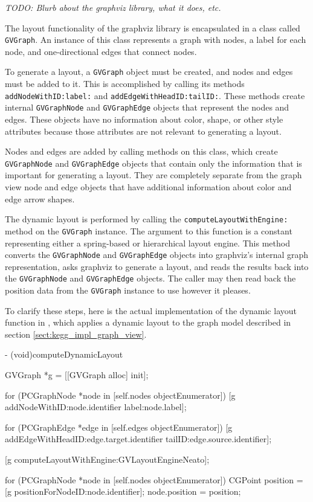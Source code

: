 \emph{TODO: Blurb about the graphviz library, what it does, etc.}

The layout functionality of the graphviz library is encapsulated in a class
called \texttt{GVGraph}. An instance of this class represents a graph with
nodes, a label for each node, and one-directional edges that connect nodes.

To generate a layout, a \texttt{GVGraph} object must be created, and nodes and
edges must be added to it. This is accomplished by calling its methods
\texttt{addNodeWithID:label:} and \texttt{addEdgeWithHeadID:tailID:}. These
methods create internal \texttt{GVGraphNode} and \texttt{GVGraphEdge} objects
that represent the nodes and edges. These objects have no information about
color, shape, or other style attributes because those attributes are not
relevant to generating a layout.

Nodes and edges are added by calling methods on this class, which create
\texttt{GVGraphNode} and \texttt{GVGraphEdge} objects that contain only the
information that is important for generating a layout. They are completely
separate from the graph view node and edge objects that have additional
information about color and edge arrow shapes.

The dynamic layout is performed by calling the \texttt{computeLayoutWithEngine:}
method on the \texttt{GVGraph} instance. The argument to this function is a
constant representing either a spring-based or hierarchical layout engine. This
method converts the \texttt{GVGraphNode} and \texttt{GVGraphEdge} objects into
graphviz's internal graph representation, asks graphviz to generate a layout,
and reads the results back into the \texttt{GVGraphNode} and
\texttt{GVGraphEdge} objects. The caller may then read back the position data
from the \texttt{GVGraph} instance to use however it pleases.

To clarify these steps, here is the actual implementation of the dynamic layout
function in \keggapp, which applies a dynamic layout to the graph model
described in section \ref{sect:kegg_impl_graph_view}.

\begin{objc}
- (void)computeDynamicLayout
{
    GVGraph *g = [[GVGraph alloc] init];
    
    for (PCGraphNode *node in [self.nodes objectEnumerator]) {
        [g addNodeWithID:node.identifier label:node.label];
    }
    
    for (PCGraphEdge *edge in [self.edges objectEnumerator]) {
        [g addEdgeWithHeadID:edge.target.identifier tailID:edge.source.identifier];
    }
    
    [g computeLayoutWithEngine:GVLayoutEngineNeato];
    
    for (PCGraphNode *node in [self.nodes objectEnumerator]) {
        CGPoint position = [g positionForNodeID:node.identifier];
        node.position = position;
    }
}
\end{objc}
